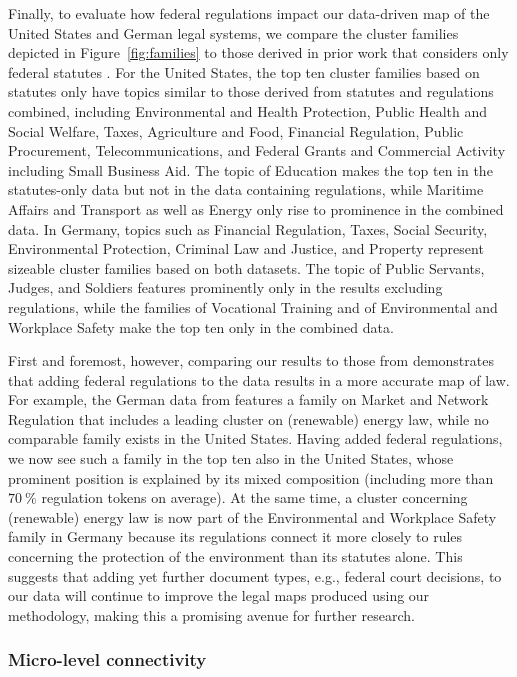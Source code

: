 \documentclass[utf8,sort&compress,table,hidelinks]{frontiersFPHY} %
\begin{document}
Finally, to evaluate how federal regulations impact our data-driven map of the United States and German legal systems, we compare the cluster families depicted in Figure~\ref{fig:families} to those derived in prior work that considers only federal statutes \cite{katz2020}.
For the United States, the top ten cluster families based on statutes only have topics similar to those derived from statutes and regulations combined, 
including Environmental and Health Protection, Public Health and Social Welfare, Taxes, Agriculture and Food, Financial Regulation, Public Procurement, Telecommunications, and Federal Grants and Commercial Activity including Small Business Aid.
The topic of Education makes the top ten in the statutes-only data but not in the data containing regulations, while Maritime Affairs and Transport as well as Energy only rise to prominence in the combined data.
In Germany, topics such as Financial Regulation, Taxes, Social Security, Environmental Protection, Criminal Law and Justice, and Property represent sizeable cluster families based on both datasets. 
The topic of Public Servants, Judges, and Soldiers features prominently only in the results excluding regulations, while the families of Vocational Training and of Environmental and Workplace Safety make the top ten only in the combined data.

First and foremost, however, comparing our results to those from \cite{katz2020} demonstrates that adding federal regulations to the data results in a more accurate map of law.
For example, the German data from \cite{katz2020} features a family on Market and Network Regulation that includes a leading cluster on (renewable) energy law, while no comparable family exists in the United States.
Having added federal regulations, we now see such a family in the top ten also in the United States, whose prominent position is explained by its mixed composition (including more than $70~\%$ regulation tokens on average).
At the same time, a cluster concerning (renewable) energy law is now part of the Environmental and Workplace Safety family in Germany because its regulations connect it more closely to rules concerning the protection of the environment than its statutes alone.
This suggests that adding yet further document types, e.g., federal court decisions, to our data will continue to improve the legal maps produced using our methodology, making this a promising avenue for further research.

\vspace*{6pt}
\subsubsection{Micro-level connectivity}
\label{subsubsec:results:connectivity:micro}
\end{document}
